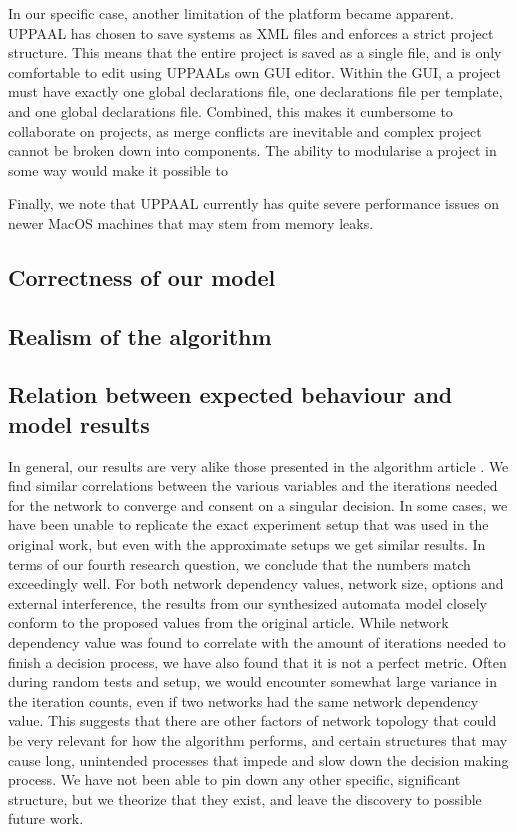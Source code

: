 In our specific case, another limitation of the platform became apparent. 
UPPAAL has chosen to save systems as XML files and enforces a strict project structure.
This means that the entire project is saved as a single file, and is only comfortable to edit using UPPAALs own GUI editor.
Within the GUI, a project must have exactly one global declarations file, one declarations file per template, and one global declarations file.
Combined, this makes it cumbersome to collaborate on projects, as merge conflicts are inevitable and complex project cannot be broken down into components.
The ability to modularise a project in some way would make it possible to 

Finally, we note that UPPAAL currently has quite severe performance issues on newer MacOS machines that may stem from memory leaks.



\subsection{Correctness of our model}



\subsection{Realism of the algorithm}
\subsection{Relation between expected behaviour and model results}
In general, our results are very alike those presented in the algorithm article \parencite{AlgorithmPaper}. We find similar correlations between the various variables and the iterations needed for the network to converge and consent on a singular decision. In some cases, we have been unable to replicate the exact experiment setup that was used in the original work, but even with the approximate setups we get similar results. In terms of our fourth research question, we conclude that the numbers match exceedingly well. For both network dependency values, network size, options and external interference, the results from our synthesized automata model closely conform to the proposed values from the original article.
While network dependency value was found to correlate with the amount of iterations needed to finish a decision process, we have also found that it is not a perfect metric. Often during random tests and setup, we would encounter somewhat large variance in the iteration counts, even if two networks had the same network dependency value. This suggests that there are other factors of network topology that could be very relevant for how the algorithm performs, and certain structures that may cause long, unintended processes that impede and slow down the decision making process. We have not been able to pin down any other specific, significant structure, but we theorize that they exist, and leave the discovery to possible future work.
